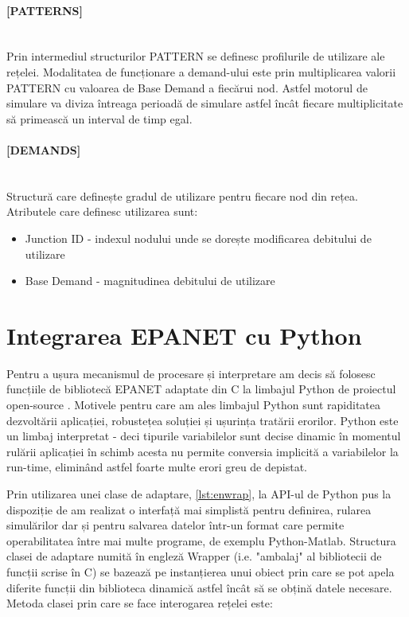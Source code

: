 \paragraph{[PATTERNS]} \mbox{} \\
Prin intermediul structurilor PATTERN se definesc profilurile de utilizare ale rețelei. Modalitatea de funcționare a demand-ului este prin multiplicarea valorii PATTERN cu valoarea de Base Demand a fiecărui nod. Astfel motorul de simulare va diviza întreaga perioadă de simulare astfel încât fiecare multiplicitate să primească un interval de timp egal.

\paragraph{[DEMANDS]} \mbox{} \\
Structură care definește gradul de utilizare pentru fiecare nod din rețea. Atributele care definesc utilizarea sunt:
\begin{itemize}
    \item Junction ID - indexul nodului unde se dorește modificarea debitului de utilizare
    \item Base Demand - magnitudinea debitului de utilizare
\end{itemize}

\section{Integrarea EPANET cu Python}
Pentru a ușura mecanismul de procesare și interpretare am decis să folosesc funcțiile de bibliotecă EPANET adaptate din C la limbajul Python de proiectul open-source \cite{EpanetPython}. Motivele pentru care am ales limbajul Python sunt rapiditatea dezvoltării aplicației, robustețea soluției și ușurința tratării erorilor. Python este un limbaj interpretat - deci tipurile variabilelor sunt decise dinamic în momentul rulării aplicației în schimb acesta nu permite conversia implicită a variabilelor la run-time, eliminând astfel foarte multe erori greu de depistat.

Prin utilizarea unei clase de adaptare, \ref{lst:enwrap}, la API-ul de Python pus la dispoziție de \cite{EpanetPython} am realizat o interfață mai simplistă pentru definirea, rularea simulărilor dar și pentru salvarea datelor într-un format care permite operabilitatea între mai multe programe, de exemplu Python-Matlab. Structura clasei de adaptare numită în engleză Wrapper (i.e. "ambalaj" al bibliotecii de funcții scrise în C) se bazează pe instanțierea unui obiect prin care se pot apela diferite funcții din biblioteca dinamică astfel încât să se obțină datele necesare.
Metoda clasei prin care se face interogarea rețelei este:

